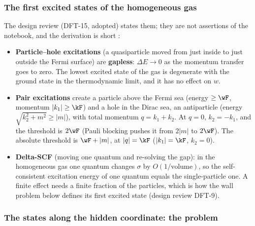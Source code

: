 \subsubsection{The first excited states of the homogeneous gas}
\label{sec:4.6.2}

The design review (DFT-15, adopted) states them; they are not assertions of the notebook, and the
derivation is short \cfderived:
\begin{itemize}
  \item \textbf{Particle--hole excitations} (a quasiparticle moved from just inside to just outside the
        Fermi surface) are \textbf{gapless}: $\Delta E\to0$ as the momentum transfer goes to zero. The
        lowest excited state of the gas is degenerate with the ground state in the thermodynamic limit,
        and it has no effect on $w$.
  \item \textbf{Pair excitations} create a particle above the Fermi sea (energy $\geq\wF$, momentum
        $|k_1|\geq\kF$) and a hole in the Dirac sea, an antiparticle (energy $\sqrt{k_2^2+m^2}\geq|m|$), with
        total momentum $q=k_1+k_2$. At $q=0$, $k_2=-k_1$, and the threshold is $2\wF$ (Pauli blocking
        pushes it from $2|m|$ to $2\wF$). The absolute threshold is $\wF+|m|$, at $|q|=\kF$ ($|k_1|=\kF$,
        $k_2=0$).
  \item \textbf{Delta-SCF} (moving one quantum and re-solving the gap): in the homogeneous gas one quantum
        changes $\sigma$ by $O(1/\text{volume})$, so the self-consistent excitation energy of one quantum
        equals the single-particle one. A finite effect needs a finite fraction of the particles, which is
        how the wall problem below defines its first excited state (design review DFT-9).
\end{itemize}

\subsubsection[{The states along the hidden coordinate: the problem [WG 2]}]{The states along the hidden coordinate: the problem }
\label{sec:4.6.3}

